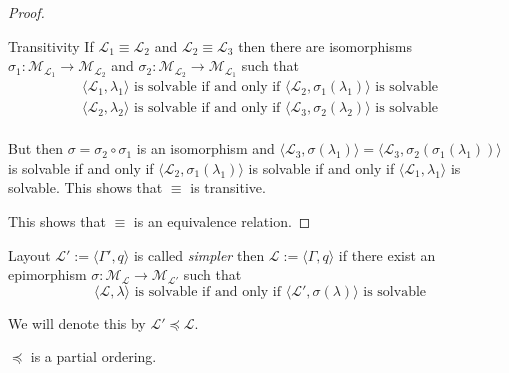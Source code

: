 \begin{proof}
\begin{namedlist}[Transitivity]
		\item[Transitivity] If $\mathcal{L}_{1} \equiv \mathcal{L}_{2}$
		and $\mathcal{L}_{2} \equiv \mathcal{L}_{3}$ then there are
		isomorphisms $\sigma_{1} : \mathcal{M}_{\mathcal{L}_{1}}
		\rightarrow \mathcal{M}_{\mathcal{L}_{2}}$ and $\sigma_{2} :
		\mathcal{M}_{\mathcal{L}_{2}} \rightarrow
		\mathcal{M}_{\mathcal{L}_{1}}$ 	such that
		\[
			\begin{array}{c}
				\langle\mathcal{L}_{1},\lambda_{1}\rangle \text{ is solvable if and only if } \langle\mathcal{L}_{2},\sigma_{1}(\lambda_{1})\rangle \text{ is solvable} \\
				\langle\mathcal{L}_{2},\lambda_{2}\rangle \text{ is solvable if and only if } \langle\mathcal{L}_{3},\sigma_{2}(\lambda_{2})\rangle \text{ is solvable} \\
			\end{array}
		\]
		
		But then $\sigma = \sigma_{2}\circ\sigma_{1}$ is an isomorphism
		and $\langle \mathcal{L}_{3}, \sigma(\lambda_{1}) \rangle = \langle
		\mathcal{L}_{3}, \sigma_{2}(\sigma_{1}(\lambda_{1})) \rangle$ is
		solvable if and only if $\langle \mathcal{L}_{2},
		\sigma_{1}(\lambda_{1}) \rangle$ is solvable if and only if 
		$\langle \mathcal{L}_{1}, \lambda_{1} \rangle$ is solvable. This
		shows that $\equiv$ is transitive.
	\end{namedlist}
	
	This shows that $\equiv$ is an equivalence relation.
\end{proof}

\begin{definition}
	Layout $\mathcal{L}':=\langle\Gamma',q\rangle$ is called \emph{simpler}
	then $\mathcal{L}:=\langle\Gamma,q\rangle$ if there exist an
	epimorphism $\sigma : \mathcal{M}_{\mathcal{L}} \rightarrow
	\mathcal{M}_{\mathcal{L}'}$ such that
	\[
		\langle\mathcal{L},\lambda\rangle \text{ is solvable}
		\text{ if and only if }
		\langle\mathcal{L}',\sigma(\lambda)\rangle \text{ is solvable}
	\]
	
	We will denote this by $\mathcal{L}' \preceq \mathcal{L}$.
\end{definition}

\begin{theorem}
	$\preceq$ is a partial ordering.
\end{theorem}

